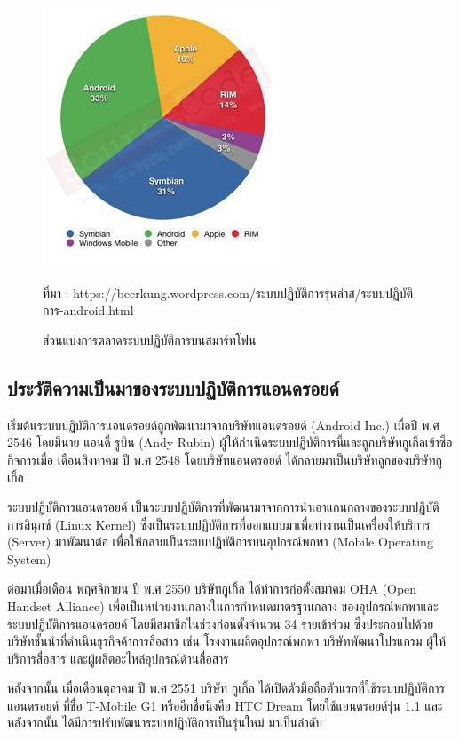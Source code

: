	\begin{figure}[H]
		\centering
		\includegraphics[width=0.5\columnwidth]{Figures/2/maketshare}
		\caption{ส่วนแบ่งการตลาดระบบปฏิบัติการบนสมาร์ทโฟน}{ที่มา :  https://beerkung.wordpress.com/ระบบปฏิบัติการรุ่นล่าส/ระบบปฏิบัติการ-android.html}
		\label{Fig:maketshare}
	\end{figure}

	\subsection{ประวัติความเป็นมาของระบบปฏิบัติการแอนดรอยด์}
	เริ่มต้นระบบปฏิบัติการแอนดรอยด์ถูกพัฒนามาจากบริษัทแอนดรอยด์ (Android Inc.) เมื่อปี พ.ศ 2546 โดยมีนาย แอนดี้ รูบิน (Andy Rubin) ผู้ให้กำเนิดระบบปฏิบัติการนี้และถูกบริษัทกูเกิ้ลเข้าซื้อกิจการเมื่อ เดือนสิงหาคม ปี พ.ศ 2548 โดยบริษัทแอนดรอยด์ ได้กลายมาเป็นบริษัทลูกของบริษัทกูเกิ้ล
	
	ระบบปฏิบัติการแอนดรอยด์ เป็นระบบปฏิบัติการที่พัฒนามาจากการนำเอาแกนกลางของระบบปฏิบัติการลินุกซ์ (Linux Kernel) ซึ่งเป็นระบบปฏิบัติการที่ออกแบบมาเพื่อทำงานเป็นเครื่องให้บริการ (Server) มาพัฒนาต่อ เพื่อให้กลายเป็นระบบปฏิบัติการบนอุปกรณ์พกพา (Mobile Operating System)
	
	ต่อมาเมื่อเดือน พฤศจิกายน ปี พ.ศ 2550 บริษัทกูเกิ้ล ได้ทำการก่อตั้งสมาคม OHA (Open Handset Alliance) เพื่อเป็นหน่วยงานกลางในการกำหนดมาตรฐานกลาง ของอุปกรณ์พกพาและระบบปฏิบัติการแอนดรอยด์ โดยมีสมาชิกในช่วงก่อนตั้งจำนวน 34 รายเข้าร่วม ซึ่งประกอบไปด้วยบริษัทชั้นนำที่ดำเนินธุรกิจด้าการสื่อสาร เช่น โรงงานผลิตอุปกรณ์พกพา บริษัทพัฒนาโปรแกรม ผู้ให้บริการสื่อสาร และผู้ผลิตอะไหล่อุปกรณ์ด้านสื่อสาร   \cite{openhandsetalliance}
	
	หลังจากนั้น เมื่อเดือนตุลาคม ปี พ.ศ 2551 บริษัท กูเกิ้ล ได้เปิดตัวมือถือตัวแรกที่ใช้ระบบปฏิบัติการแอนดรอยด์ ที่ชื่อ T-Mobile G1 หรืออีกชื่อนึงคือ HTC Dream โดยใช้แอนดรอยด์รุ่น 1.1 และหลังจากนั้น ได้มีการปรับพัฒนาระบบปฏิบัติการเป็นรุ่นใหม่ มาเป็นลำดับ
	
